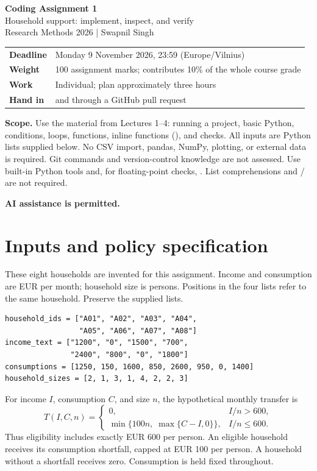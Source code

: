\documentclass[11pt,a4paper]{article}
\newcommand{\py}[1]{\texttt{\detokenize{#1}}}
\begin{document}
\begin{center}
{\Large\textbf{Coding Assignment 1}}\\[4pt]
{\large Household support: implement, inspect, and verify}\\[5pt]
Research Methods 2026 \quad | \quad Swapnil Singh
\end{center}

\begin{tabularx}{\linewidth}{@{}lX@{}}
\textbf{Deadline} & Monday 9 November 2026, 23:59 (Europe/Vilnius) \\
\textbf{Weight} & 100 assignment marks; contributes 10\% of the whole course grade \\
\textbf{Work} & Individual; plan approximately three hours \\
\textbf{Hand in} & \py{exercise_01.ipynb} and \py{README.md} through a GitHub pull request \\
\end{tabularx}

\textbf{Scope.} Use the material from Lectures 1--4: running a project, basic
Python, conditions, loops, functions, inline functions (\py{lambda}), and checks.
All inputs are Python lists supplied below. No CSV import, pandas, NumPy,
plotting, or external data is required. Git commands and version-control
knowledge are not assessed.
Use built-in Python tools
and, for floating-point checks, \py{math.isclose}. List comprehensions and
\py{try}/\py{except} are not required.

\textbf{AI assistance is permitted.}

\section*{Inputs and policy specification}
These eight households are invented for this assignment. Income and consumption
are EUR per month; household size is persons. Positions in the four lists refer
to the same household. Preserve the supplied lists.

\begin{lstlisting}
household_ids = ["A01", "A02", "A03", "A04",
                 "A05", "A06", "A07", "A08"]
income_text = ["1200", "0", "1500", "700",
               "2400", "800", "0", "1800"]
consumptions = [1250, 150, 1600, 850, 2600, 950, 0, 1400]
household_sizes = [2, 1, 3, 1, 4, 2, 2, 3]
\end{lstlisting}

For income $I$, consumption $C$, and size $n$, the hypothetical monthly transfer is
\[
T(I,C,n)=
\begin{cases}
0, & I/n>600,\\
\min\{100n,\;\max\{C-I,0\}\}, & I/n\leq600.
\end{cases}
\]
Thus eligibility includes exactly EUR 600 per person. An eligible household
receives its consumption shortfall, capped at EUR 100 per person. A household
without a shortfall receives zero. Consumption is held fixed throughout.
\end{document}
